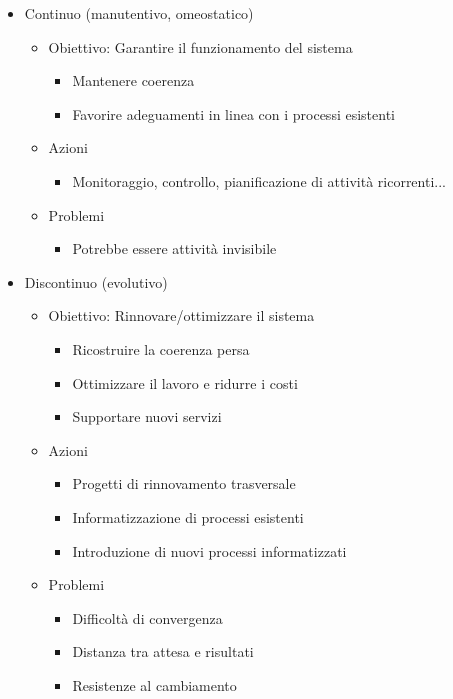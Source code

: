 \begin{itemize}
  \item 
  Continuo (manutentivo, omeostatico)
  
  \begin{itemize}
    \item Obiettivo: Garantire il funzionamento del sistema
    \begin{itemize}
      \item 
      Mantenere coerenza
      \item
      Favorire adeguamenti in linea con i processi esistenti
    \end{itemize}
    \item 
    Azioni
    \begin{itemize}
      \item Monitoraggio, controllo, pianificazione di attività ricorrenti...
    \end{itemize}
    \item 
    Problemi
    \begin{itemize}
      \item Potrebbe essere attivit\`a invisibile
    \end{itemize}
  \end{itemize}
  
  \item 
  Discontinuo (evolutivo)
  
  \begin{itemize}
    \item 
    Obiettivo: Rinnovare/ottimizzare il sistema
    \begin{itemize}
      \item 
      Ricostruire la coerenza persa
      \item
      Ottimizzare il lavoro e ridurre i costi
      \item
      Supportare nuovi servizi
    \end{itemize}
  
    \item
     Azioni 
     \begin{itemize}
       \item 
       Progetti di rinnovamento trasversale
       \item
       Informatizzazione di processi esistenti
       \item
       Introduzione di nuovi processi informatizzati
     \end{itemize}
     
     \item 
     Problemi
     \begin{itemize}
       \item 
       Difficolt\`a di convergenza
       \item
       Distanza tra attesa e risultati
       \item 
       Resistenze al cambiamento
     \end{itemize}
  \end{itemize}
\end{itemize}


